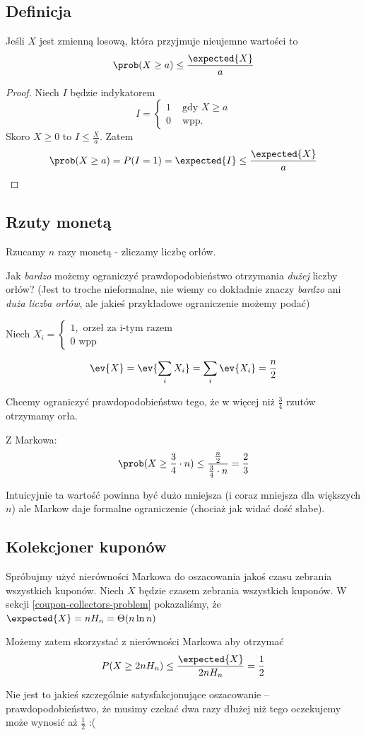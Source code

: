 \subsection{Definicja}
\begin{theorem}
	\label{markov-inequality}
	Jeśli \( X \) jest zmienną losową, która przyjmuje nieujemne wartości to
	\[
		\prob(X \geq a) \leq \frac{\expected{X}}{a}
	\]
\end{theorem}
\begin{proof}
	Niech \( I \) będzie indykatorem
	\[
		I = \begin{cases}
			1 & \text{ gdy } X \geq a \\
			0 & \text{ wpp. }
		\end{cases}
	\]
	Skoro \( X \geq 0 \) to \( I \leq \frac{X}{a} \).
	Zatem
	\[
		\prob(X \geq a) = P(I = 1) = \expected{I} \leq \frac{\expected{X}}{a}
	\]
\end{proof}

\subsection{Rzuty monetą}
\label{markov-coin-tosses}
Rzucamy \(n\) razy monetą - zliczamy liczbę orłów.

Jak \textit{bardzo} możemy ograniczyć prawdopodobieństwo otrzymania \textit{dużej} liczby orłów?
(Jest to troche nieformalne, nie wiemy co dokładnie znaczy \textit{bardzo} ani \textit{duża liczba orłów}, ale jakieś przykładowe ograniczenie możemy podać)

Niech \(X_i = \begin{cases}
	1, \text{ orzeł za i-tym razem} \\
	0 \text{ wpp}
\end{cases}\)

\[
	\ev{X} = \ev{\sum_i X_i} = \sum_i \ev{X_i} = \frac{n}{2}
\]

Chcemy ograniczyć prawdopodobieństwo tego, że w więcej niż \(\frac{3}{4}\) rzutów otrzymamy orła.

Z Markowa:
\[
	\prob(X \geq \frac{3}{4} \cdot n) \leq \frac{\frac{n}{2}}{\frac{3}{4} \cdot n} = \frac{2}{3}
\]

Intuicyjnie ta wartość powinna być dużo mniejsza (i coraz mniejsza dla większych \(n\)) ale Markow daje formalne ograniczenie (chociaż jak widać dość słabe).

\subsection{Kolekcjoner kuponów}
\label{markov-coupon-collector}
Spróbujmy użyć nierówności Markowa do oszacowania jakoś czasu zebrania wszystkich kuponów.
Niech \( X \) będzie czasem zebrania wszystkich kuponów.
W sekcji \ref{coupon-collectors-problem} pokazaliśmy, że \( \expected{X} = nH_n = \Theta(n \ln n) \)

Możemy zatem skorzystać z nierówności Markowa aby otrzymać
\[
	P(X \geq 2n H_n) \leq \frac{\expected{X}}{2n H_n} = \frac{1}{2}
\]

Nie jest to jakieś szczególnie satysfakcjonujące oszacowanie -- prawdopodobieństwo, że musimy czekać dwa
razy dłużej niż tego oczekujemy może wynosić aż \( \frac{1}{2} \) :(